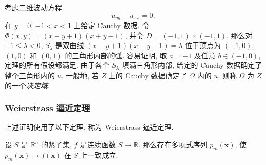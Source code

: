 \begin{Example}
\label{ex:wave-cauchy-domain-of-determinacy}
考虑二维波动方程
\begin{equation}\label{eq:wave-determinacy-example}
u_{yy}-u_{xx}=0,
\end{equation}
在 $y=0$, $-1<x<1$ 上给定 Cauchy 数据. 令 $\Phi(x,y)=(x-y+1)(x+y-1)$, 并令 $D=(-1,1)\times(-1,1)$. 那么对 $-1\leq\lambda<0$, $S_\lambda$ 是双曲线 $(x-y+1)(x+y-1)=\lambda$ 位于顶点为 $(-1,0)$, $(1,0)$ 和 $(0,1)$ 的三角形内部的弧. 容易证明, 取 $a=-1$ 及任意 $b\in(-1,0)$, 定理的所有假设都满足. 由于各个 $S_\lambda$ 填满三角形内部, 给定的 Cauchy 数据确定了整个三角形内的 $u$. 一般地, 若 $Z$ 上的 Cauchy 数据确定了 $\Omega$ 内的 $u$, 则称 $\Omega$ 为 $Z$ 的一个\emph{决定域}.
\end{Example}

\subsubsection{Weierstrass 逼近定理}\label{subsec:weierstrass-approximation}

上述证明使用了以下定理, 称为 Weierstrass 逼近定理.

\begin{Theorem}
\label{thm:weierstrass-approximation}
设 $S$ 是 $\mathbb{R}^n$ 的紧子集, $f$ 是连续函数 $S\to\mathbb{R}$. 那么存在多项式序列 $p_m(\bm{x})$, 使 $p_m(\bm{x})\to f(\bm{x})$ 在 $S$ 上一致成立.
\end{Theorem}

